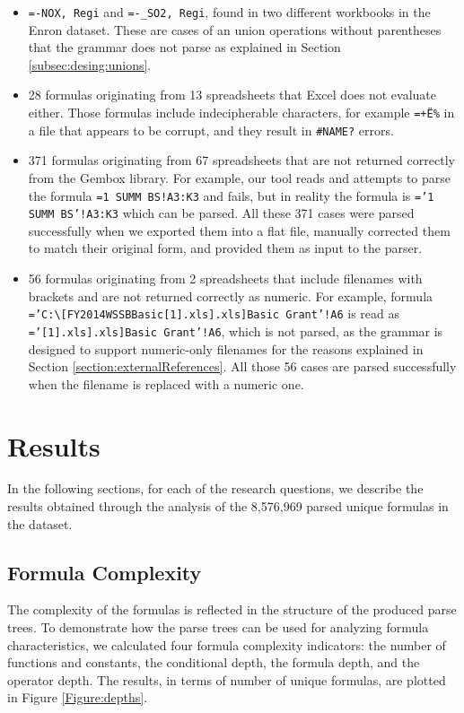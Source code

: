 \documentclass[times]{smrauth}
\begin{document}
\begin{itemize}
	\item \texttt{=-NOX, Regi} and \texttt{=-_SO2, Regi}, found in two different workbooks in the Enron dataset. These are cases of an union operations without parentheses that the grammar does not parse as explained in Section \ref{subsec:desing:unions}.
	\item 28 formulas originating from 13 spreadsheets that Excel does not evaluate either. Those formulas include indecipherable characters, for example \texttt{=+Ë\%} in a file that appears to be corrupt, and they result in \texttt{\#NAME?} errors.
	\item 371 formulas originating from 67 spreadsheets that are not returned correctly from the Gembox library. For example, our tool reads and attempts to parse the formula \texttt{=1 SUMM BS!A3:K3} and fails, but in reality the formula is \texttt{='1 SUMM BS'!A3:K3} which can be parsed. All these 371 cases were parsed successfully when we exported them into a flat file, manually corrected them to match their original form, and provided them as input to the parser.
	\item 56 formulas originating from 2 spreadsheets that include filenames with brackets and are not returned correctly as numeric. For example, formula \texttt{='C:\textbackslash[FY2014WSSBBasic[1].xls].xls]Basic Grant'!A6} is read as \texttt{='[1].xls].xls]Basic Grant'!A6}, which is not parsed, as the grammar is designed to support numeric-only filenames for the reasons explained in Section \ref{section:externalReferences}. All those 56 cases are parsed successfully when the filename is replaced with a numeric one.
\end{itemize}

\section{Results}
\label{section:results}
In the following sections, for each of the research questions, we describe the results obtained through the analysis of the 8,576,969 parsed unique formulas in the dataset.

\subsection{Formula Complexity}

The complexity of the formulas is reflected in the structure of the produced parse trees. To demonstrate how the parse trees can be used for analyzing formula characteristics, we calculated four formula complexity indicators:  the number of functions and constants, the conditional depth, the formula depth, and the operator depth. The results, in terms of number of unique formulas, are plotted in Figure \ref{Figure:depths}.
\end{document}

